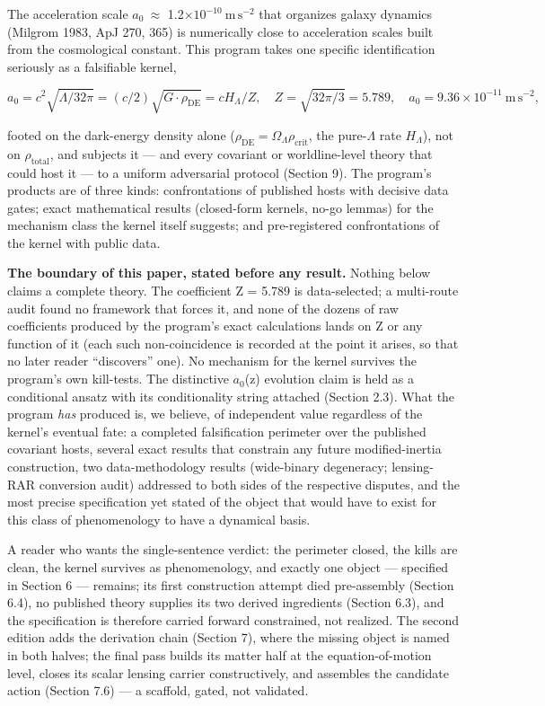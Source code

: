 \documentclass[11pt,a4paper]{article}
\begin{document}
The acceleration scale $a_{0}\ \approx$ 1.2$\times10^{-10}\ \mathrm{m\,s^{-2}}$ that organizes galaxy dynamics (Milgrom 1983, ApJ 270, 365) is numerically close to acceleration scales built from the cosmological constant. This program takes one specific identification seriously as a falsifiable kernel,

\begin{equation*}
a_0 = c^2\sqrt{\Lambda/32\pi} = (c/2)\sqrt{G\cdot\rho_{\mathrm{DE}}} = cH_\Lambda/Z, \quad Z = \sqrt{32\pi/3} = 5.789, \quad a_0 = 9.36\times10^{-11}\ \mathrm{m\,s^{-2}},
\end{equation*}

footed on the dark-energy density alone ($\rho_{\mathrm{DE}} = \Omega_\Lambda \rho_{\mathrm{crit}}$, the pure-$\Lambda$ rate $H_\Lambda$), not on $\rho_{\mathrm{total}}$, and subjects it --- and every covariant or worldline-level theory that could host it --- to a uniform adversarial protocol (Section 9). The program's products are of three kinds: confrontations of published hosts with decisive data gates; exact mathematical results (closed-form kernels, no-go lemmas) for the mechanism class the kernel itself suggests; and pre-registered confrontations of the kernel with public data.

\textbf{The boundary of this paper, stated before any result.} Nothing below claims a complete theory. The coefficient Z = 5.789 is data-selected; a multi-route audit found no framework that forces it, and none of the dozens of raw coefficients produced by the program's exact calculations lands on Z or any function of it (each such non-coincidence is recorded at the point it arises, so that no later reader ``discovers'' one). No mechanism for the kernel survives the program's own kill-tests. The distinctive $a_{0}$(z) evolution claim is held as a conditional ansatz with its conditionality string attached (Section 2.3). What the program \emph{has} produced is, we believe, of independent value regardless of the kernel's eventual fate: a completed falsification perimeter over the published covariant hosts, several exact results that constrain any future modified-inertia construction, two data-methodology results (wide-binary degeneracy; lensing-RAR conversion audit) addressed to both sides of the respective disputes, and the most precise specification yet stated of the object that would have to exist for this class of phenomenology to have a dynamical basis.

A reader who wants the single-sentence verdict: the perimeter closed, the kills are clean, the kernel survives as phenomenology, and exactly one object --- specified in Section 6 --- remains; its first construction attempt died pre-assembly (Section 6.4), no published theory supplies its two derived ingredients (Section 6.3), and the specification is therefore carried forward constrained, not realized. The second edition adds the derivation chain (Section 7), where the missing object is named in both halves; the final pass builds its matter half at the equation-of-motion level, closes its scalar lensing carrier constructively, and assembles the candidate action (Section 7.6) --- a scaffold, gated, not validated.
\end{document}
